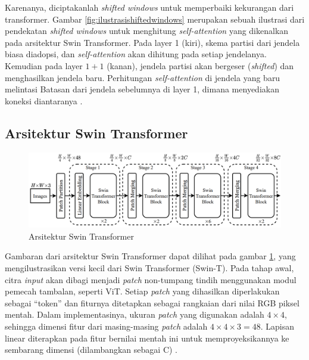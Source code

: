 Karenanya, diciptakanlah \emph{shifted windows} untuk memperbaiki kekurangan dari \linebreak transformer. Gambar \ref{fig:ilustrasishiftedwindows} merupakan sebuah ilustrasi dari pendekatan \emph{shifted windows} 
untuk menghitung \emph{self-attention} yang dikenalkan pada arsitektur Swin Transformer. Pada layer 1 (kiri), skema partisi dari jendela biasa diadopsi, dan \emph{self-attention} 
akan dihitung pada setiap jendelanya. Kemudian pada layer \begin{math}1+1\end{math} (kanan), jendela partisi akan bergeser (\emph{shifted}) dan menghasilkan jendela baru. Perhitungan 
\emph{self-attention} di jendela yang baru melintasi Batasan dari jendela sebelumnya di layer 1, dimana menyediakan koneksi diantaranya \parencite{Liu2021}.

\subsection{Arsitektur Swin Transformer}

\begin{figure}[h!]
  \centering
  \includegraphics[scale=0.5]{gambar/Arsitektur Swin.png}
  \caption{Arsitektur Swin Transformer}
  \label{fig:arsitekturswintransformer}
\end{figure}

Gambaran dari arsitektur Swin Transformer dapat dilihat pada gambar \ref{fig:arsitekturswintransformer}, yang mengilustrasikan versi kecil dari Swin Transformer (Swin-T). Pada tahap awal, citra \emph{input} akan 
dibagi menjadi \emph{patch} non-tumpang tindih menggunakan modul pemecah tambalan, seperti ViT. Setiap \emph{patch} yang dihasilkan diperlakukan sebagai “token” dan fiturnya ditetapkan sebagai 
rangkaian dari nilai RGB piksel mentah. Dalam implementasinya, ukuran \emph{patch} yang digunakan adalah \begin{math}4 \times 4\end{math}, sehingga dimensi fitur dari masing-masing \emph{patch} adalah 
\begin{math}4 \times 4 \times 3 = 48\end{math}. Lapisan \linebreak linear diterapkan pada fitur bernilai mentah ini untuk memproyeksikannya ke sembarang dimensi (dilambangkan sebagai C) \parencite{Liu2021}.

